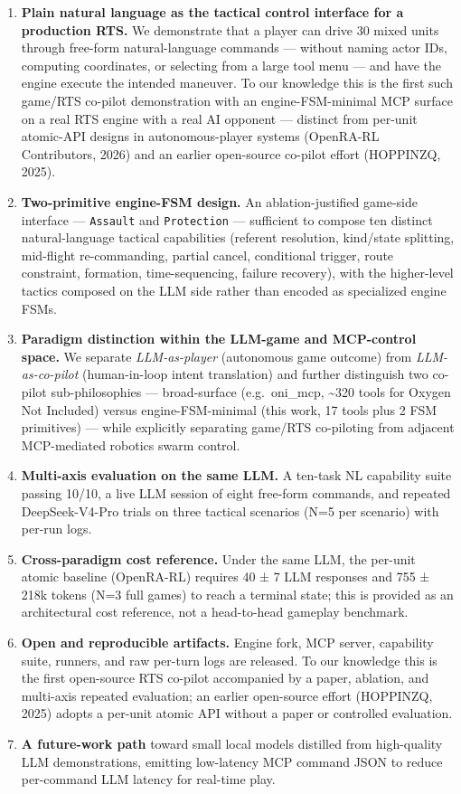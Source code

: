 \documentclass[
  journal]{IEEEtran}
\providecommand{\tightlist}{%
  \setlength{\itemsep}{0pt}\setlength{\parskip}{0pt}}
\begin{document}
\begin{enumerate}
\def\labelenumi{\arabic{enumi}.}
\tightlist
\item
  \textbf{Plain natural language as the tactical control interface for a
  production RTS.} We demonstrate that a player can drive 30 mixed units
  through free-form natural-language commands --- without naming actor
  IDs, computing coordinates, or selecting from a large tool menu ---
  and have the engine execute the intended maneuver. To our knowledge
  this is the first such game/RTS co-pilot demonstration with an
  engine-FSM-minimal MCP surface on a real RTS engine with a real AI
  opponent --- distinct from per-unit atomic-API designs in
  autonomous-player systems (OpenRA-RL Contributors, 2026) and an
  earlier open-source co-pilot effort (HOPPINZQ, 2025).
\item
  \textbf{Two-primitive engine-FSM design.} An ablation-justified
  game-side interface --- \texttt{Assault} and \texttt{Protection} ---
  sufficient to compose ten distinct natural-language tactical
  capabilities (referent resolution, kind/state splitting, mid-flight
  re-commanding, partial cancel, conditional trigger, route constraint,
  formation, time-sequencing, failure recovery), with the higher-level
  tactics composed on the LLM side rather than encoded as specialized
  engine FSMs.
\item
  \textbf{Paradigm distinction within the LLM-game and MCP-control
  space.} We separate \emph{LLM-as-player} (autonomous game outcome)
  from \emph{LLM-as-co-pilot} (human-in-loop intent translation) and
  further distinguish two co-pilot sub-philosophies --- broad-surface
  (e.g.~oni\_mcp, \textasciitilde320 tools for Oxygen Not Included)
  versus engine-FSM-minimal (this work, 17 tools plus 2 FSM primitives)
  --- while explicitly separating game/RTS co-piloting from adjacent
  MCP-mediated robotics swarm control.
\item
  \textbf{Multi-axis evaluation on the same LLM.} A ten-task NL
  capability suite passing 10/10, a live LLM session of eight free-form
  commands, and repeated DeepSeek-V4-Pro trials on three tactical
  scenarios (N=5 per scenario) with per-run logs.
\item
  \textbf{Cross-paradigm cost reference.} Under the same LLM, the
  per-unit atomic baseline (OpenRA-RL) requires 40 ± 7 LLM responses and
  755 ± 218k tokens (N=3 full games) to reach a terminal state; this is
  provided as an architectural cost reference, not a head-to-head
  gameplay benchmark.
\item
  \textbf{Open and reproducible artifacts.} Engine fork, MCP server,
  capability suite, runners, and raw per-turn logs are released. To our
  knowledge this is the first open-source RTS co-pilot accompanied by a
  paper, ablation, and multi-axis repeated evaluation; an earlier
  open-source effort (HOPPINZQ, 2025) adopts a per-unit atomic API
  without a paper or controlled evaluation.
\item
  \textbf{A future-work path} toward small local models distilled from
  high-quality LLM demonstrations, emitting low-latency MCP command JSON
  to reduce per-command LLM latency for real-time play.
\end{enumerate}
\end{document}
